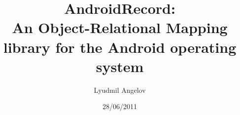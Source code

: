 \documentclass[a4paper,12pt]{article}
\begin{document}
	
\title{AndroidRecord:\\
An Object-Relational Mapping library for the Android operating system}
\author{Lyudmil Angelov}
\date{28/06/2011}
\maketitle
\end{document}
